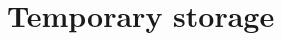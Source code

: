 \documentclass[a4paper,10pt,fleqn]{book}
\begin{document}


\part{Temporary storage}


\end{document}
